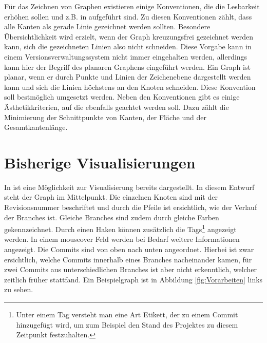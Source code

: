 \documentclass[nocolor]{tudbook}
\begin{document}
Für das Zeichnen von Graphen existieren einige Konventionen, die die Lesbarkeit erhöhen sollen und z.B. in \cite{Aesthetik} aufgeführt sind. Zu diesen Konventionen zählt, dass alle Kanten als gerade Linie gezeichnet werden sollten. Besondere Übersichtlichkeit wird erzielt, wenn der Graph kreuzungsfrei gezeichnet werden kann, sich die gezeichneten Linien also nicht schneiden. Diese Vorgabe kann in einem Versionsverwaltungssystem nicht immer eingehalten werden, allerdings kann hier der Begriff des planaren Graphens eingeführt werden. Ein Graph ist planar, wenn er durch Punkte und Linien der Zeichenebene dargestellt werden kann und sich die Linien höchstens an den Knoten schneiden. Diese Konvention soll bestmöglich umgesetzt werden. Neben den Konventionen gibt es einige Ästhetikkriterien, auf die ebenfalls geachtet werden soll. Dazu zählt die Minimierung der Schnittpunkte von Kanten, der Fläche und der Gesamtkantenlänge.

\section{Bisherige Visualisierungen}
In \cite{Gruppe2.1} ist eine Möglichkeit zur Visualisierung bereits dargestellt. In diesem Entwurf steht der Graph im Mittelpunkt. Die einzelnen Knoten sind mit der Revisionsnummer beschriftet und durch die Pfeile ist ersichtlich, wie der Verlauf der Branches ist. Gleiche Branches sind zudem durch gleiche Farben gekennzeichnet. Durch einen Haken können zusätzlich die Tags\footnote{Unter einem Tag versteht man eine Art Etikett, der zu einem Commit hinzugefügt wird, um zum Beispiel den Stand des Projektes zu diesem Zeitpunkt festzuhalten.} angezeigt werden. In einem mouseover Feld werden bei Bedarf weitere Informationen angezeigt. Die Commits sind von oben nach unten angeordnet. Hierbei ist zwar ersichtlich, welche Commits innerhalb eines Branches nacheinander kamen, für zwei Commits aus unterschiedlichen Branches ist aber nicht erkenntlich, welcher zeitlich früher stattfand. Ein Beispielgraph ist in Abbildung \ref{fig:Vorarbeiten} links zu sehen.
\end{document}
